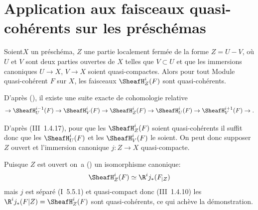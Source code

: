 
\chapter[Faisceaux quasi-coh\'erents sur les pr\'esch\'emas]{Application aux faisceaux quasi-coh\'erents sur les pr\'esch\'emas} \label{II}


\begin{supproposition} \label{II.1}
Soient\pageoriginale $X$ un pr\'esch\'ema, $Z$ une partie localement ferm\'ee de la forme $Z=U-V$, o\`u $U$ et $V$ sont deux parties ouvertes de $X$ telles que $V\subset U$ et que les immersions canoniques $U\to X$, $V\to X$ soient quasi-compactes. Alors pour tout Module quasi-coh\'erent $F$ sur $X$, les faisceaux ${\SheafH}_Z^i(F)$ sont quasi-coh\'erents.
\end{supproposition}

D'apr\`es (), il existe une suite exacte de cohomologie relative
$$
\to {\SheafH}_U^{i-1}(F) \to {\SheafH}_V^{i}(F) \to {\SheafH}_Z^{i}(F) \to {\SheafH}_U^{i}(F) \to {\SheafH}_V^{i+1}(F) \to.
$$

D'apr\`es (\EGA III~1.4.17), pour que les ${\SheafH}_Z^i(F)$ soient quasi-coh\'erents il suffit donc que les ${\SheafH}_U^i(F)$ et les ${\SheafH}_V^i(F)$ le soient. On peut donc supposer $Z$ ouvert et l'immersion canonique $j:Z\to X$ quasi-compacte.

Puisque $Z$ est ouvert on~a () un isomorphisme canonique:
$$
{\SheafH}_Z^{i}(F) \simeq \R^ij_{*}(F_{|Z})
$$
mais $j$ est s\'epar\'e (\EGA I~5.5.1) et quasi-compact donc (\EGA III~1.4.10) les $\R^ij_{*}(F|Z)={\SheafH}_Z^{i}(F)$ sont quasi-coh\'erents, ce qui ach\`eve la d\'emonstration.

